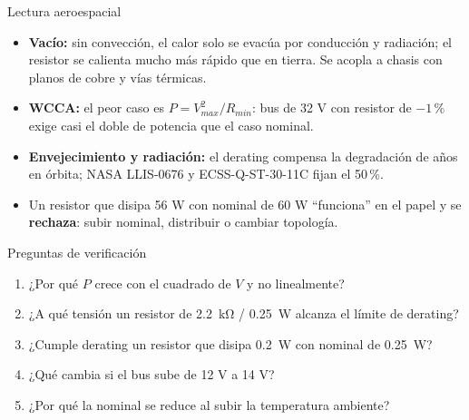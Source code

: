 \documentclass[aspectratio=169]{beamer}
\begin{document}
\begin{frame}{Lectura aeroespacial}
  \begin{itemize}
    \item \textbf{Vacío:} sin convección, el calor solo se evacúa por conducción y
      radiación; el resistor se calienta mucho más rápido que en tierra.
      Se acopla a chasis con planos de cobre y vías térmicas.
    \item \textbf{WCCA:} el peor caso es $P = V_{max}^2/R_{min}$: bus de 32 V con
      resistor de $-1\,\text{\%}$ exige casi el doble de potencia que el caso nominal.
    \item \textbf{Envejecimiento y radiación:} el derating compensa la degradación
      de años en órbita; NASA LLIS-0676 y ECSS-Q-ST-30-11C fijan el 50\,\%.
    \item Un resistor que disipa 56 W con nominal de 60 W ``funciona'' en el papel
      y se \textbf{rechaza}: subir nominal, distribuir o cambiar topología.
  \end{itemize}
\end{frame}

\begin{frame}{Preguntas de verificación}
  \begin{enumerate}
    \item ¿Por qué $P$ crece con el cuadrado de $V$ y no linealmente?
    \item ¿A qué tensión un resistor de \SI{2.2}{\kilo\ohm} / \SI{0.25}{\watt} alcanza el límite de derating?
    \item ¿Cumple derating un resistor que disipa \SI{0.2}{\watt} con nominal de \SI{0.25}{\watt}?
    \item ¿Qué cambia si el bus sube de 12 V a 14 V?
    \item ¿Por qué la nominal se reduce al subir la temperatura ambiente?
  \end{enumerate}
\end{frame}
\end{document}

